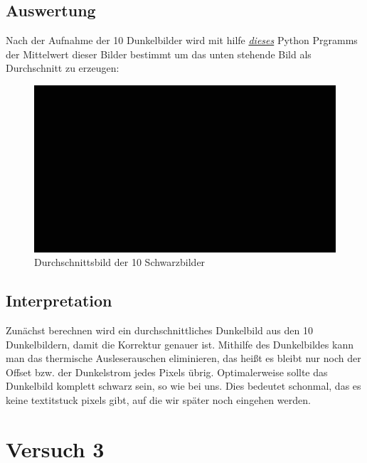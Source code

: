 \documentclass[12pt, oneside, a4paper, \docLanguage]{report}
\begin{document}
\section{Auswertung}
\label{chap:VERSUCH_2_AUSWERTUNG}
Nach der Aufnahme der 10 Dunkelbilder wird mit hilfe \hyperref[chap:APPENDIX_SOURCECODE_V2]{\textit{dieses}} Python Prgramms der Mittelwert dieser Bilder bestimmt um das unten stehende Bild als Durchschnitt zu erzeugen:
\begin{figure}[H]
\centering
\includegraphics[scale=0.5]{../AverageBlackImage.png}
\caption{Durchschnittsbild der 10 Schwarzbilder}
\end{figure}


\section{Interpretation}
\label{chap:VERSUCH_2_INTERPRETATION}

\begin{normalsize}
Zunächst berechnen wird ein durchschnittliches Dunkelbild aus den 10 Dunkelbildern, damit die Korrektur genauer ist.
Mithilfe des Dunkelbildes kann man das thermische Ausleserauschen eliminieren, das heißt es bleibt nur noch der Offset bzw. der Dunkelstrom jedes Pixels übrig. Optimalerweise sollte das Dunkelbild komplett schwarz sein, so wie bei uns. Dies bedeutet schonmal, das es keine textit{stuck pixels} gibt, auf die wir später noch eingehen werden.\newline
\end{normalsize}

%
%
\chapter{Versuch 3}
\label{chap:VERSUCH_3}
\end{document}
